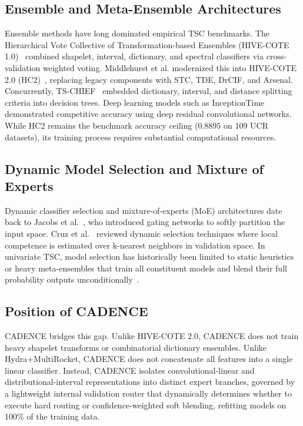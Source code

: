 \documentclass[journal,twocolumn]{article}
\begin{document}
\subsection{Ensemble and Meta-Ensemble Architectures}
Ensemble methods have long dominated empirical TSC benchmarks. The Hierarchical Vote Collective of Transformation-based Ensembles (HIVE-COTE 1.0)~\cite{lines2018hive} combined shapelet, interval, dictionary, and spectral classifiers via cross-validation weighted voting. Middlehurst et al. modernized this into HIVE-COTE 2.0 (HC2)~\cite{middlehurst2021hive}, replacing legacy components with STC, TDE, DrCIF, and Arsenal. Concurrently, TS-CHIEF~\cite{shifaz2020tschief} embedded dictionary, interval, and distance splitting criteria into decision trees. Deep learning models such as InceptionTime~\cite{fawaz2020inceptiontime} demonstrated competitive accuracy using deep residual convolutional networks. While HC2 remains the benchmark accuracy ceiling ($0.8895$ on 109 UCR datasets), its training process requires substantial computational resources.

\subsection{Dynamic Model Selection and Mixture of Experts}
Dynamic classifier selection and mixture-of-experts (MoE) architectures date back to Jacobs et al.~\cite{jacobs1991adaptive}, who introduced gating networks to softly partition the input space. Cruz et al.~\cite{cruz2018dynamic} reviewed dynamic selection techniques where local competence is estimated over k-nearest neighbors in validation space. In univariate TSC, model selection has historically been limited to static heuristics or heavy meta-ensembles that train all constituent models and blend their full probability outputs unconditionally~\cite{middlehurst2021hive}.

\subsection{Position of CADENCE}
CADENCE bridges this gap. Unlike HIVE-COTE 2.0, CADENCE does not train heavy shapelet transforms or combinatorial dictionary ensembles. Unlike Hydra+MultiRocket, CADENCE does not concatenate all features into a single linear classifier. Instead, CADENCE isolates convolutional-linear and distributional-interval representations into distinct expert branches, governed by a lightweight internal validation router that dynamically determines whether to execute hard routing or confidence-weighted soft blending, refitting models on 100\% of the training data.
\end{document}
